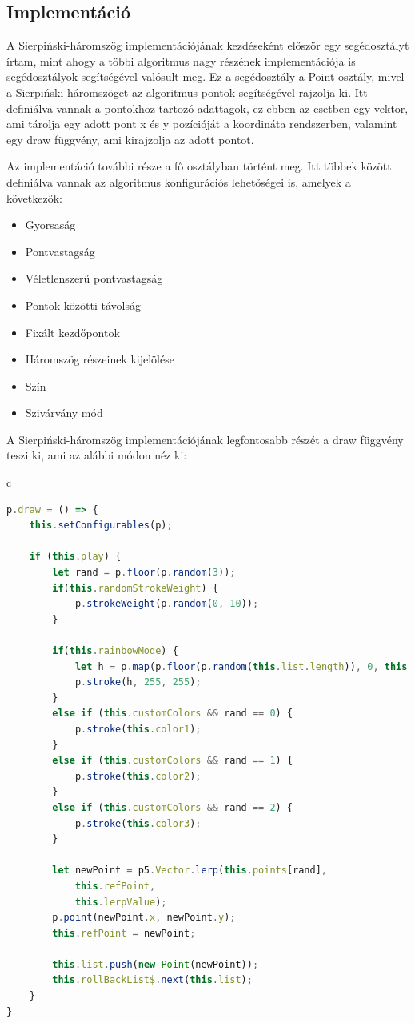 \subsection*{Implementáció}
A Sierpiński-háromszög implementációjának kezdéseként először egy segédosztályt írtam, mint ahogy a többi algoritmus nagy részének implementációja is segédosztályok segítségével valósult meg. Ez a segédosztály a Point osztály, mivel a Sierpiński-háromszöget az algoritmus pontok segítségével rajzolja ki. Itt definiálva vannak a pontokhoz tartozó adattagok, ez ebben az esetben egy vektor, ami tárolja egy adott pont x és y pozícióját a koordináta rendszerben, valamint egy draw függvény, ami kirajzolja az adott pontot.
\par Az implementáció további része a fő osztályban történt meg. Itt többek között definiálva vannak az algoritmus konfigurációs lehetőségei is, amelyek a következők:
\begin{itemize}
	\item Gyorsaság
	\item Pontvastagság
	\item Véletlenszerű pontvastagság
	\item Pontok közötti távolság
	\item Fixált kezdőpontok
	\item Háromszög részeinek kijelölése
	\item Szín
	\item Szivárvány mód
\end{itemize}
A Sierpiński-háromszög implementációjának legfontosabb részét a draw függvény teszi ki, ami az alábbi módon néz ki:
\begin{center}
\begin{tabular}{c}
\begin{lstlisting}[language=typescript]
p.draw = () => {
	this.setConfigurables(p);
	
	if (this.play) {
		let rand = p.floor(p.random(3));
		if(this.randomStrokeWeight) {
			p.strokeWeight(p.random(0, 10));
		}
	
		if(this.rainbowMode) {
			let h = p.map(p.floor(p.random(this.list.length)), 0, this.list.length, 0, 360);
			p.stroke(h, 255, 255);
		}
		else if (this.customColors && rand == 0) {
			p.stroke(this.color1);
		} 
		else if (this.customColors && rand == 1) {
			p.stroke(this.color2);
		} 
		else if (this.customColors && rand == 2) {
			p.stroke(this.color3);
		} 
	
		let newPoint = p5.Vector.lerp(this.points[rand], 
			this.refPoint, 
			this.lerpValue);
		p.point(newPoint.x, newPoint.y);
		this.refPoint = newPoint;
		
		this.list.push(new Point(newPoint));
		this.rollBackList$.next(this.list);
	}
}	
\end{lstlisting}
\end{tabular}
\end{center}
